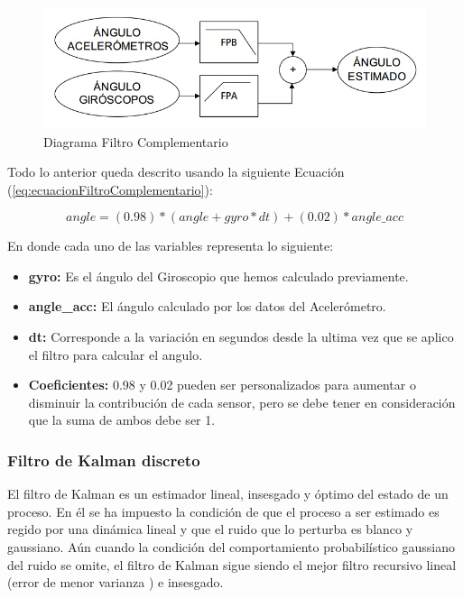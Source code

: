 \documentclass[12pt,a4paper]{article}
\begin{document}
\begin{figure}[H]
\centering
	\includegraphics[scale=0.5]{images/FiltroComplementario}
	\caption{Diagrama Filtro Complementario}
    \label{fig:diagramafiltrocomplementario}
\end{figure}

Todo lo anterior queda descrito usando la siguiente Ecuación (\ref{eq:ecuacionFiltroComplementario}):

\begin{equation}
\label{eq:ecuacionFiltroComplementario}
angle = (0.98)*(angle+gyro*dt)+(0.02)*angle\_acc
\end{equation}

En donde cada uno de las variables representa lo siguiente:
\begin{itemize}
\item \textbf{gyro:} Es el ángulo del Giroscopio que hemos calculado previamente.
\item \textbf{angle\_acc:} El ángulo calculado por los datos del Acelerómetro.
\item \textbf{dt:} Corresponde a la variación en segundos desde la ultima vez que se aplico el filtro para calcular el angulo.
\item \textbf{Coeficientes:}  0.98 y 0.02 pueden ser personalizados para aumentar o disminuir la contribución de cada sensor, pero se debe tener en consideración que la suma de ambos debe ser 1.
\end{itemize}

\subsubsection{Filtro de Kalman discreto}
El filtro de Kalman es un estimador lineal, insesgado y óptimo del estado de un proceso. En él se ha impuesto la condición de que el proceso a ser estimado es regido por una dinámica lineal y que el ruido que lo perturba es blanco y gaussiano. Aún cuando la condición del comportamiento probabilístico gaussiano del ruido se omite, el filtro de Kalman sigue siendo el mejor filtro recursivo lineal (error de menor varianza ) e insesgado.
\end{document}
